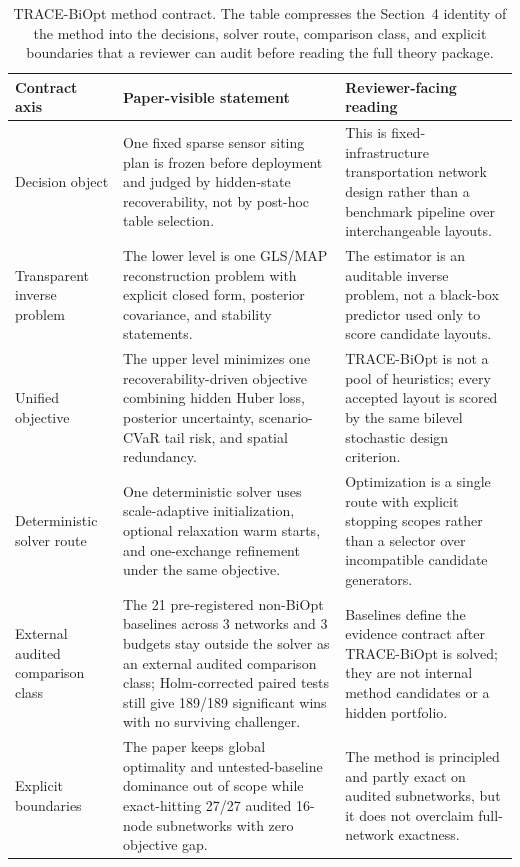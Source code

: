 \begin{table}[pos=htbp]
\centering
\caption{TRACE-BiOpt method contract. The table compresses the Section~4 identity of the method into the decisions, solver route, comparison class, and explicit boundaries that a reviewer can audit before reading the full theory package.}
\label{tab:trace-biopt-method-contract}
\small
\begin{tabularx}{\textwidth}{>{\raggedright\arraybackslash}p{}>{\raggedright\arraybackslash}p{}>{\raggedright\arraybackslash}X}
\toprule
Contract axis & Paper-visible statement & Reviewer-facing reading \\
\midrule
Decision object & One fixed sparse sensor siting plan is frozen before deployment and judged by hidden-state recoverability, not by post-hoc table selection. & This is fixed-infrastructure transportation network design rather than a benchmark pipeline over interchangeable layouts. \\
Transparent inverse problem & The lower level is one GLS/MAP reconstruction problem with explicit closed form, posterior covariance, and stability statements. & The estimator is an auditable inverse problem, not a black-box predictor used only to score candidate layouts. \\
Unified objective & The upper level minimizes one recoverability-driven objective combining hidden Huber loss, posterior uncertainty, scenario-CVaR tail risk, and spatial redundancy. & TRACE-BiOpt is not a pool of heuristics; every accepted layout is scored by the same bilevel stochastic design criterion. \\
Deterministic solver route & One deterministic solver uses scale-adaptive initialization, optional relaxation warm starts, and one-exchange refinement under the same objective. & Optimization is a single route with explicit stopping scopes rather than a selector over incompatible candidate generators. \\
External audited comparison class & The 21 pre-registered non-BiOpt baselines across 3 networks and 3 budgets stay outside the solver as an external audited comparison class; Holm-corrected paired tests still give 189/189 significant wins with no surviving challenger. & Baselines define the evidence contract after TRACE-BiOpt is solved; they are not internal method candidates or a hidden portfolio. \\
Explicit boundaries & The paper keeps global optimality and untested-baseline dominance out of scope while exact-hitting 27/27 audited 16-node subnetworks with zero objective gap. & The method is principled and partly exact on audited subnetworks, but it does not overclaim full-network exactness. \\
\bottomrule
\end{tabularx}
\end{table}
